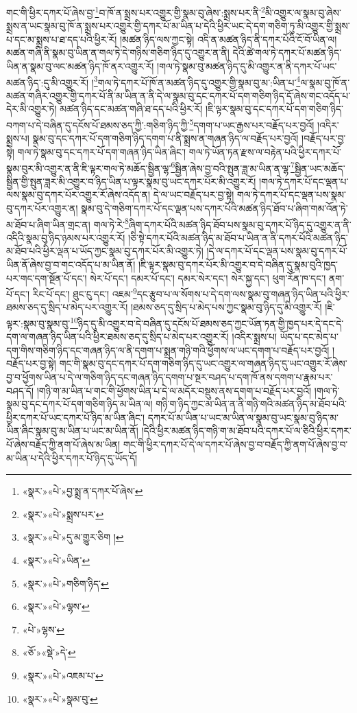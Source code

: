 གང་གི་ཕྱིར་དཀར་པོ་ཞེས་བྱ་\footnote{«སྣར་»«པེ་»བྱ་སྨྲ་ན་དཀར་པོ་ཞེས་}བ་ཁོ་ན་སྨྲས་པར་འགྱུར་གྱི་སྣམ་བུ་ཞེས་:སྨྲས་པར་ནི་\footnote{«སྣར་»«པེ་»སྨྲས་པར་}མི་འགྱུར་ལ་སྣམ་བུ་ཞེས་སྨྲས་ན་ཡང་སྣམ་བུ་ཁོ་ན་སྨྲས་པར་འགྱུར་གྱི་དཀར་པོ་མ་ཡིན་པ་དེའི་ཕྱིར་ཡང་དེ་དག་གཅིག་ཏུ་མི་འགྱུར་གྱི་སྨྲས་པ་དང་མ་སྨྲས་པ་ཐ་དད་པའི་ཕྱིར་རོ། །མཚན་ཉིད་ལས་ཀྱང་སྟེ། འདི་ན་མཚན་ཉིད་ནི་དཀར་པོའི་ངོ་བོ་ཡིན་ལ། མཚན་གཞི་ནི་སྣམ་བུ་ཡིན་ན་གལ་ཏེ་དེ་གཉིས་གཅིག་ཉིད་དུ་འགྱུར་ན་ནི། དེའི་ཚེ་གལ་ཏེ་དཀར་པོ་མཚན་ཉིད་ཡིན་ན་སྣམ་བུ་ལང་མཚན་ཉིད་ཁོ་ནར་འགྱུར་རོ། །གལ་ཏེ་སྣམ་བུ་མཚན་ཉིད་དུ་མི་འགྱུར་ན་ནི་དཀར་པོ་ཡང་མཚན་ཉིད་:དུ་མི་འགྱུར་རོ། །\footnote{«སྣར་»«པེ་»དུ་མ་གྱུར་ཅིག །}གལ་ཏེ་དཀར་པོ་ཁོ་ན་མཚན་ཉིད་དུ་འགྱུར་གྱི་སྣམ་བུ་མ་:ཡིན་པ་\footnote{«སྣར་»«པེ་»ཡིན་}ལ་སྣམ་བུ་ཁོ་ན་མཚན་གཞིར་འགྱུར་གྱི་དཀར་པོ་ནི་མ་ཡིན་ན་ནི་དེ་ལ་སྣམ་བུ་དང་དཀར་པོ་དག་གཅིག་ཉིད་དོ་ཞེས་གང་འདོད་པ་དེར་མི་འགྱུར་ཏེ། མཚན་ཉིད་དང་མཚན་གཞི་ཐ་དད་པའི་ཕྱིར་རོ། །ཇི་ལྟར་སྣམ་བུ་དང་དཀར་པོ་དག་གཅིག་ཉིད་བཀག་པ་དེ་བཞིན་དུ་དངོས་པོ་ཐམས་ཅད་ཀྱི་:གཅིག་ཉིད་ཀྱི་\footnote{«སྣར་»«པེ་»གཅིག་ཉིད་}དགག་པ་ཡང་རྒྱས་པར་བརྗོད་པར་བྱའོ། །འདིར་སྨྲས་པ། སྣམ་བུ་དང་དཀར་པོ་དག་གཅིག་ཉིད་དགག་པ་ནི་སྨྲས་ན་གཞན་ཉིད་ལ་བརྗོད་པར་བྱའོ། །བརྗོད་པར་བྱ་སྟེ། གལ་ཏེ་སྣམ་བུ་དང་དཀར་པོ་དག་གཞན་ཉིད་ཡིན་ཞིང་། གལ་ཏེ་ཡོན་ཏན་རྫས་ལ་བརྟེན་པའི་ཕྱིར་དཀར་པོ་སྣམ་བུར་མི་འགྱུར་ན་ནི་ཇི་ལྟར་གལ་ཏེ་མཆོད་སྦྱིན་ལྷ་\footnote{«སྣར་»«པེ་»ལྷས་}སྦྱིན་ཞེས་བྱ་བའི་སྤུན་ཟླ་མ་ཡིན་ན་ལྷ་\footnote{«པེ་»ལྷས་}སྦྱིན་ཡང་མཆོད་སྦྱིན་གྱི་སྤུན་ཟླར་མི་འགྱུར་བ་ཉིད་ཡིན་པ་ལྟར་སྣམ་བུ་ཡང་དཀར་པོར་མི་འགྱུར་རོ། །གལ་ཏེ་དཀར་པོ་དང་ལྡན་པ་ལས་སྣམ་བུ་དཀར་པོར་འགྱུར་རོ་ཞེས་འདོད་ན། དེ་ལ་ཡང་བརྗོད་པར་བྱ་སྟེ། གལ་ཏེ་དཀར་པོ་དང་ལྡན་པས་སྣམ་བུ་དཀར་པོར་འགྱུར་ན། སྣམ་བུ་དེ་གཅིག་དཀར་པོ་དང་ལྡན་པས་དཀར་པོའི་མཚན་ཉིད་ཐོབ་པ་ཞིག་གམ་འོན་ཏེ་མ་ཐོབ་པ་ཞིག་ཡིན་གྲང་ན། གལ་ཏེ་རེ་\footnote{«ཅོ་»«སྡེ་»དེ་}ཞིག་དཀར་པོའི་མཚན་ཉིད་ཐོབ་པས་སྣམ་བུ་དཀར་པོ་ཉིད་དུ་འགྱུར་ན་ནི་འདིའི་སྣམ་བུ་ཉིད་ཉམས་པར་འགྱུར་རོ། །ཅི་སྟེ་དཀར་པོའི་མཚན་ཉིད་མ་ཐོབ་པ་ཡིན་ན་ནི་དཀར་པོའི་མཚན་ཉིད་མ་ཐོབ་པའི་ཕྱིར་ལྡན་པ་ཡོད་ཀྱང་སྣམ་བུ་དཀར་པོར་མི་འགྱུར་ཏེ། །དེ་ལ་དཀར་པོ་དང་ལྡན་པས་སྣམ་བུ་དཀར་པོ་ཡིན་ནོ་ཞེས་བྱ་བ་གང་འདོད་པ་མ་ཡིན་ནོ། །ཇི་ལྟར་སྣམ་བུ་དཀར་པོར་མི་འགྱུར་བ་དེ་བཞིན་དུ་སྣམ་བུའི་ཁྱད་པར་གང་དག་སྔོན་པོ་དང་། སེར་པོ་དང་། དམར་པོ་དང་། དམར་སེར་དང་། སེར་སྐྱ་དང་། ཕུག་རོན་ཁ་དང་། ནག་པོ་དང་། རིང་པོ་དང་། ཐུང་ངུ་དང་། འཇམ་\footnote{«སྣར་»«པེ་»འཇམ་པ་}དང་རྩུབ་པ་ལ་སོགས་པ་དེ་དག་ལས་སྣམ་བུ་གཞན་ཉིད་ཡིན་པའི་ཕྱིར་ཐམས་ཅད་དུ་སྲིད་པ་མེད་པར་འགྱུར་རོ། །ཐམས་ཅད་དུ་སྲིད་པ་མེད་པས་ཀྱང་སྣམ་བུ་ཉིད་དུ་མི་འགྱུར་རོ། །ཇི་ལྟར་:སྣམ་བུ་སྣམ་བུ་\footnote{«སྣར་»«པེ་»སྣམ་བུ་}ཉིད་དུ་མི་འགྱུར་བ་དེ་བཞིན་དུ་དངོས་པོ་ཐམས་ཅད་ཀྱང་ཡོན་ཏན་གྱི་ཁྱད་པར་དེ་དང་དེ་དག་ལ་གཞན་ཉིད་ཡིན་པའི་ཕྱིར་ཐམས་ཅད་དུ་སྲིད་པ་མེད་པར་འགྱུར་རོ། །འདིར་སྨྲས་པ། ཡོད་པ་དང་མེད་པ་དག་གིས་གཅིག་ཉིད་དང་གཞན་ཉིད་ལ་ནི་དགག་པ་སྨྲན་གཉི་གའི་ཕྱོགས་ལ་ཡང་དགག་པ་བརྗོད་པར་བྱའོ། །བརྗོད་པར་བྱ་སྟེ། གང་གི་སྣམ་བུ་དང་དཀར་པོ་དག་གཅིག་ཉིད་དུ་ཡང་འགྱུར་ལ་གཞན་ཉིད་དུ་ཡང་འགྱུར་རོ་ཞེས་བྱ་བ་ཕྱོགས་ཡིན་པ་དེ་ལ་གཅིག་ཉིད་དང་གཞན་ཉིད་དགག་པ་སྔར་བཤད་པ་དག་ཁོ་ནས་དགག་པ་རྣམ་པར་བཤད་དོ། །གཉི་ག་མ་ཡིན་པ་གང་གི་ཕྱོགས་ཡིན་པ་དེ་ལ་མདོར་བསྡུས་ནས་དགག་པ་བརྗོད་པར་བྱའོ། །གལ་ཏེ་སྣམ་བུ་དང་དཀར་པོ་དག་གཅིག་ཉིད་མ་ཡིན་ལ། གཉི་ག་ཉིད་ཀྱང་མ་ཡིན་ན་ནི་གཉི་གའི་མཚན་ཉིད་མ་ཐོབ་པའི་ཕྱིར་དཀར་པོ་ཡང་དཀར་པོ་ཉིད་མ་ཡིན་ཞིང་། དཀར་པོ་མ་ཡིན་པ་ཡང་མ་ཡིན་ལ་སྣམ་བུ་ཡང་སྣམ་བུ་ཉིད་མ་ཡིན་ཞིང་སྣམ་བུ་མ་ཡིན་པ་ཡང་མ་ཡིན་ནོ། །དེའི་ཕྱིར་མཚན་ཉིད་གཉི་ག་མ་ཐོབ་པའི་དཀར་པོ་ལ་ཅིའི་ཕྱིར་དཀར་པོ་ཞེས་བརྗོད་ཀྱི་ནག་པོ་ཞེས་མ་ཡིན། གང་གི་ཕྱིར་དཀར་པོ་དེ་ལ་དཀར་པོ་ཞེས་བྱ་བ་བརྗོད་ཀྱི་ནག་པོ་ཞེས་བྱ་བ་མ་ཡིན་པ་དེའི་ཕྱིར་དཀར་པོ་ཉིད་དུ་ཡོད་དོ། 